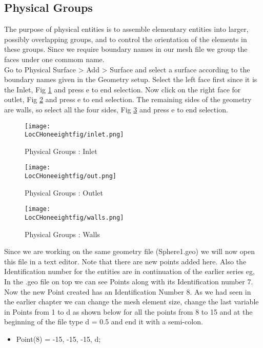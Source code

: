 \subsection{Physical Groups}

The purpose of physical entities is to assemble elementary entities into larger, possibly overlapping groups, and to control the orientation of the elements in these groups.
Since we require boundary names in our mesh file we group the faces under one commom name.\\

\flushleft Go to Physical Surface > Add > Surface and select a surface according to the boundary names given in the Geometry setup. Select the left face first since it is the Inlet, Fig \ref {inlet} and press e to end selection. Now click on the right face for outlet, Fig \ref{out} and press e to end selection. The remaining sides of the geometry are walls, so select all the four sides, Fig \ref{wall} and press e to end selection.

\begin{figure}[h]  
\centering
\texttt{[image: \\LocCHoneeightfig/inlet.png]}
\caption{Physical Groups : Inlet}
\label{inlet}
\end{figure}

\begin{figure}[h]  
\centering
\texttt{[image: \\LocCHoneeightfig/out.png]}
\caption{Physical Groups : Outlet}
\label{out}
\end{figure}

\begin{figure}[h]  
\centering
\texttt{[image: \\LocCHoneeightfig/walls.png]}
\caption{Physical Groups : Walls}
\label{wall}
\end{figure}

\flushleft Since we are working on the same geometry file (Sphere1.geo) we will now open this file in a text editor. Note that there are new points added here. Also the Identification number for the entities are in continuation of the earlier series eg, In the .geo file on top we can see Points along with its Identification number 7. Now the new Point created has an Identification Number 8. As we had seen in the earlier chapter we can change the mesh element size, change the last variable in Points from 1 to d as shown below for all the points from 8 to 15 and at the beginning of the file type d = 0.5 and end it with a semi-colon.

\begin{itemize}
  \item Point(8) = {-15, -15, -15, d};
\end{itemize}

